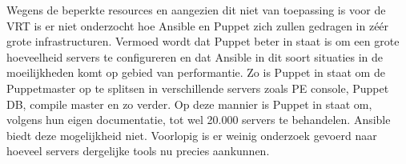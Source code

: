Wegens de beperkte resources en aangezien dit niet van toepassing is voor de VRT is er niet onderzocht hoe Ansible en Puppet zich zullen gedragen in z\'e\'er grote infrastructuren. Vermoed wordt dat Puppet beter in staat is om een grote hoeveelheid servers te configureren en dat Ansible in dit soort situaties in de moeilijkheden komt op gebied van performantie. Zo is Puppet in staat om de Puppetmaster op te splitsen in verschillende servers zoals PE console, Puppet DB, compile master en zo verder. Op deze mannier is Puppet in staat om, volgens hun eigen documentatie, tot wel 20.000 servers te behandelen. Ansible biedt deze mogelijkheid niet. Voorlopig is er weinig onderzoek gevoerd naar hoeveel servers dergelijke tools nu precies aankunnen. 